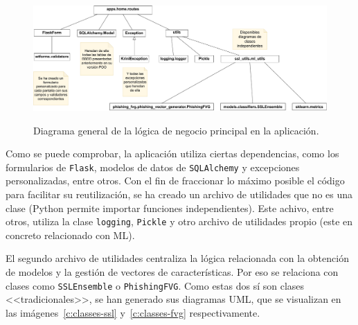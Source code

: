 \begin{figure}[h]
	\caption[Diagrama: lógica general]{Diagrama general de la lógica de negocio principal en la aplicación.}
	\centering
	\includegraphics[width=\textwidth]{../img/anexos/diagrams/classes-general}
	\label{c:classes-general}
\end{figure}

Como se puede comprobar, la aplicación utiliza ciertas dependencias, como los formularios de \texttt{Flask}, modelos de datos de \texttt{SQLAlchemy} y excepciones personalizadas, entre otros. Con el fin de fraccionar lo máximo posible el código para facilitar su reutilización, se ha creado un archivo de utilidades que no es una clase (Python permite importar funciones independientes). Este achivo, entre otros, utiliza la clase \texttt{logging}, \texttt{Pickle} y otro archivo de utilidades propio (este en concreto relacionado con ML).

El segundo archivo de utilidades centraliza la lógica relacionada con la obtención de modelos y la gestión de vectores de características. Por eso se relaciona con clases como \texttt{SSLEnsemble} o \texttt{PhishingFVG}. Como estas dos sí son clases <<tradicionales>>, se han generado sus diagramas UML, que se visualizan en las imágenes~\ref{c:classes-ssl} y~\ref{c:classes-fvg} respectivamente.

